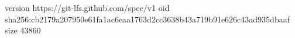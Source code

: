 version https://git-lfs.github.com/spec/v1
oid sha256:cb2179a207950e61fa1ac6eaa1763d2cc3638b43a719b91e626c43ad935dbaaf
size 43860
